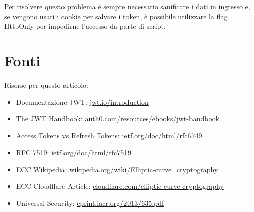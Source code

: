 \documentclass{article}
\begin{document}
Per risolvere questo problema è sempre necessario sanificare i dati in ingresso e, se vengono usati i cookie per salvare i token, è possibile utilizzare la flag HttpOnly per impedirne l'accesso da parte di script.


\section*{Fonti}
Risorse per questo articolo:

\begin{itemize}
	\item Documentazione JWT: \href{https://jwt.io/introduction}{jwt.io/introduction}
	\item The JWT Handbook: \href{https://auth0.com/resources/ebooks/jwt-handbook}{auth0.com/resources/ebooks/jwt-handbook}
	\item Access Tokens vs Refresh Tokens: \href{https://datatracker.ietf.org/doc/html/rfc6749#section-1.4}{ietf.org/doc/html/rfc6749}
	\item RFC 7519: \href{https://datatracker.ietf.org/doc/html/rfc7519}{ietf.org/doc/html/rfc7519}
	\item ECC Wikipedia: \href{https://en.wikipedia.org/wiki/Elliptic-curve_cryptography}{wikipedia.org/wiki/Elliptic-curve\_cryptography}
	\item ECC Cloudflare Article: \href{https://blog.cloudflare.com/a-relatively-easy-to-understand-primer-on-elliptic-curve-cryptography/}{cloudflare.com/elliptic-curve-cryptography}
	\item Universal Security: \href{https://eprint.iacr.org/2013/635.pdf}{eprint.iacr.org/2013/635.pdf}
\end{itemize}
\end{document}
